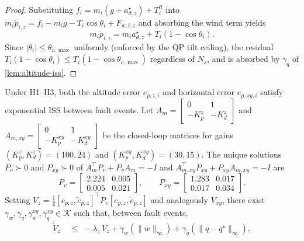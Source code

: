 \begin{proof}
Substituting $f_i = m_i(g + a_{d,z}^\star) + T_i^{\mathrm{ff}}$
into $m_i \ddot{p}_{i,z} = f_i - m_i g - T_i\cos\theta_i +
F_{w,i,z}$ and absorbing the wind term yields
\begin{equation}
  m_i \ddot{p}_{i,z}
    = m_i a_{d,z}^\star + T_i(1 - \cos\theta_i).
  \label{eq:alt-dynamics-residual}
\end{equation}
Since $|\theta_i| \le \theta_{c,\max}$ uniformly (enforced by
the QP tilt ceiling), the residual
$T_i(1-\cos\theta_i) \le T_i(1 - \cos\theta_{c,\max})$
regardless of $N_s$, and is absorbed by $\gamma_q$ of
\cref{lem:altitude-iss}.
\end{proof}

\begin{lemma}
\label{lem:altitude-iss}
\label{lem:horizontal-iss}
Under H1--H3, both the altitude error $e_{p,z,i}$ and horizontal
error $e_{p,xy,i}$ satisfy exponential ISS between fault events.
Let $A_m\!=\!\begin{bmatrix}0&1\\-K_p^z&-K_d^z\end{bmatrix}$ and
$A_{m,xy}\!=\!\begin{bmatrix}0&1\\-K_p^{xy}&-K_d^{xy}\end{bmatrix}$
be the closed-loop matrices for gains $(K_p^z,K_d^z)\!=\!(100,24)$
and $(K_p^{xy},K_d^{xy})\!=\!(30,15)$.
The unique solutions $P_v \succ 0$ and $P_{xy} \succ 0$ of
$A_m^\top P_v + P_v A_m = -I$ and
$A_{m,xy}^\top P_{xy} + P_{xy} A_{m,xy} = -I$ are
\begin{equation}
  P_v = \begin{bmatrix} 2.224 & 0.005 \\ 0.005 & 0.021 \end{bmatrix},
  \qquad
  P_{xy} = \begin{bmatrix} 1.283 & 0.017 \\ 0.017 & 0.034 \end{bmatrix}.
  \label{eq:Pv-numeric}
\end{equation}
Setting $V_z = \tfrac{1}{2}[e_{p,z},\dot{e}_{p,z}]^\top P_v
[e_{p,z},\dot{e}_{p,z}]$ and analogously $V_{xy}$, there exist
$\gamma_w,\gamma_q,\gamma_w^{xy},\gamma_q^{xy} \in \mathcal{K}$
such that, between fault events,
\begin{align}
  \dot V_z &\;\le\; -\lambda_z\,V_z
    + \gamma_w(\|w\|_\infty) + \gamma_q(\|q - q^\star\|_\infty),

\end{align}
\end{lemma}
